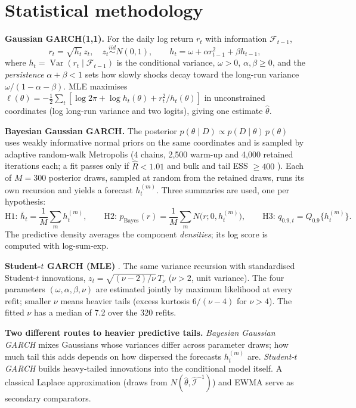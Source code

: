 \documentclass[11pt]{article}
\newcommand{\Var}{\operatorname{Var}}
\newcommand{\pbox}[1]{\par\smallskip\noindent\colorbox{boxbg}{\parbox{\dimexpr\textwidth-2\fboxsep}{#1}}\par\smallskip}
\begin{document}
\section{Statistical methodology}
\textbf{Gaussian GARCH(1,1).} For the daily log return $r_t$ with information $\mathcal F_{t-1}$,
\begin{equation}
r_t=\sqrt{h_t}\,z_t,\quad z_t\overset{iid}{\sim}N(0,1),\qquad h_t=\omega+\alpha r_{t-1}^2+\beta h_{t-1},
\end{equation}
where $h_t=\Var(r_t\mid\mathcal F_{t-1})$ is the conditional variance, $\omega>0$, $\alpha,\beta\ge0$, and the
\emph{persistence} $\alpha+\beta<1$ sets how slowly shocks decay toward the long-run variance $\omega/(1-\alpha-\beta)$.
MLE maximises $\ell(\theta)=-\frac12\sum_t[\log2\pi+\log h_t(\theta)+r_t^2/h_t(\theta)]$ in unconstrained coordinates
(log long-run variance and two logits), giving one estimate $\hat\theta$.

\textbf{Bayesian Gaussian GARCH.} The posterior $p(\theta\mid D)\propto p(D\mid\theta)\,p(\theta)$ \cite{ardia2008} uses weakly
informative normal priors on the same coordinates and is sampled by adaptive random-walk Metropolis \cite{roberts1997,haario2001} (4 chains, 2{,}500
warm-up and 4{,}000 retained iterations each; a fit passes only if $\hat R<1.01$ and bulk and tail ESS $\ge400$ \cite{vehtari2021}). Each
of $M=300$ posterior draws, sampled at random from the retained draws, runs its own recursion and yields a forecast
$h_t^{(m)}$. Three summaries are used, one per hypothesis:
\begin{equation}
\text{H1: }\bar h_t=\frac1M\sum_m h_t^{(m)},\qquad
\text{H2: }p_{\text{Bayes}}(r)=\frac1M\sum_m N\bigl(r;0,h_t^{(m)}\bigr),\qquad
\text{H3: }q_{0.9,t}=Q_{0.9}\{h_t^{(m)}\}.
\end{equation}
The predictive density averages the component \emph{densities}; its log score is computed with log-sum-exp.

\textbf{Student-$t$ GARCH (MLE)} \cite{bollerslev1987}. The same variance recursion with standardised Student-$t$ innovations,
$z_t=\sqrt{(\nu-2)/\nu}\,T_\nu$ ($\nu>2$, unit variance). The four parameters $(\omega,\alpha,\beta,\nu)$ are estimated
jointly by maximum likelihood at every refit; smaller $\nu$ means heavier tails (excess kurtosis $6/(\nu-4)$ for
$\nu>4$). The fitted $\nu$ has a median of 7.2 over the 320 refits.

\pbox{\textbf{Two different routes to heavier predictive tails.} \emph{Bayesian Gaussian GARCH} mixes Gaussians whose
variances differ across parameter draws; how much tail this adds depends on how dispersed the forecasts
$h_t^{(m)}$ are. \emph{Student-$t$ GARCH} builds heavy-tailed innovations into the conditional model itself. A
classical Laplace approximation (draws from $N(\hat\theta,\hat{\mathcal I}^{-1})$) and EWMA \cite{riskmetrics1996} serve as secondary comparators.}
\end{document}
